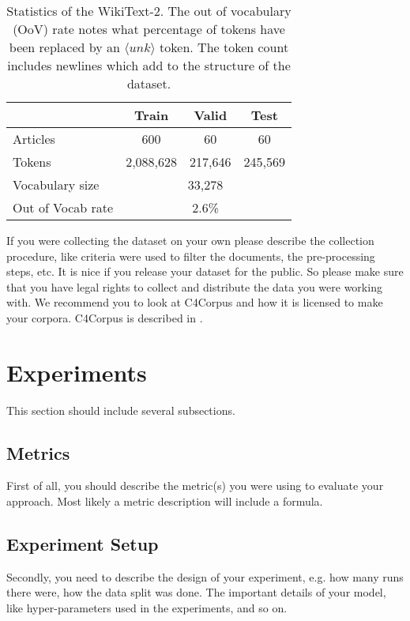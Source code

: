 \documentclass{article}
\begin{document}
\begin{table}[tbh!]
\begin{center}
\begin{tabular}[t]{|l|ccc|}
\hline
 & Train & Valid & Test \\
\hline
Articles & 600 & 60 & 60  \\
Tokens& 2,088,628 & 217,646 & 245,569 \\
Vocabulary size & \multicolumn{3}{c|}{33,278} \\
Out of Vocab rate &  \multicolumn{3}{c|}{2.6\%}  \\
\hline
\end{tabular}
\caption{Statistics of the WikiText-2. The out of vocabulary (OoV) rate notes what percentage of tokens have been replaced by an $\langle unk \rangle$ token. The token count includes newlines which add to the structure of the dataset.}
\label{tab:statistics}
\end{center}
\end{table}

If you were collecting the dataset on your own please describe the collection procedure, like criteria were used to filter the documents, the pre-processing steps, etc. It is nice if you release your dataset for the public. So please make sure that you have legal rights to collect and distribute the data you were working with. We recommend you to look at C4Corpus and how it is licensed to make your corpora. C4Corpus is described in \cite{habernal2016c4corpus}.

\section{Experiments}
This section should include several subsections.
\subsection{Metrics}
First of all, you should describe the metric(s) you were using to evaluate your approach. Most likely a metric description will include a formula.

\subsection{Experiment Setup}
Secondly, you need to describe the design of your experiment, e.g. how many runs there were, how the data split was done. The important details of your model, like hyper-parameters used in the experiments, and so on.
\end{document}
